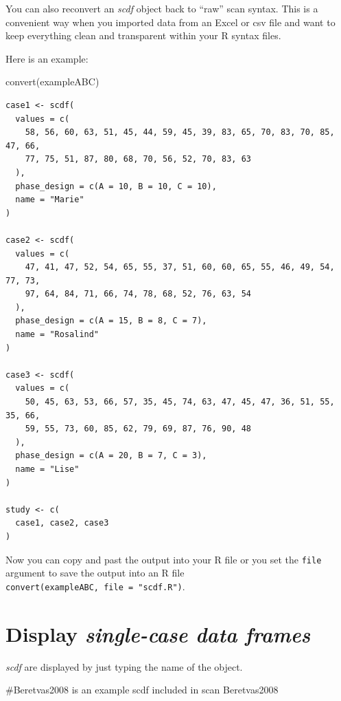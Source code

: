 \documentclass[
  letterpaper,
  DIV=11,
  numbers=noendperiod]{scrreprt}
\newenvironment{Shaded}{\begin{snugshade}}{\end{snugshade}}
\newcommand{\CommentTok}[1]{\textcolor[rgb]{0.37,0.37,0.37}{#1}}
\newcommand{\FunctionTok}[1]{\textcolor[rgb]{0.28,0.35,0.67}{#1}}
\newcommand{\NormalTok}[1]{\textcolor[rgb]{0.00,0.23,0.31}{#1}}
\begin{document}
You can also reconvert an \emph{scdf} object back to ``raw'' scan
syntax. This is a convenient way when you imported data from an Excel or
csv file and want to keep everything clean and transparent within your R
syntax files.

Here is an example:

\begin{Shaded}
\begin{Highlighting}[]
\FunctionTok{convert}\NormalTok{(exampleABC)}
\end{Highlighting}
\end{Shaded}

\begin{verbatim}
case1 <- scdf(
  values = c(
    58, 56, 60, 63, 51, 45, 44, 59, 45, 39, 83, 65, 70, 83, 70, 85, 47, 66,
    77, 75, 51, 87, 80, 68, 70, 56, 52, 70, 83, 63
  ),
  phase_design = c(A = 10, B = 10, C = 10),
  name = "Marie"
)

case2 <- scdf(
  values = c(
    47, 41, 47, 52, 54, 65, 55, 37, 51, 60, 60, 65, 55, 46, 49, 54, 77, 73,
    97, 64, 84, 71, 66, 74, 78, 68, 52, 76, 63, 54
  ),
  phase_design = c(A = 15, B = 8, C = 7),
  name = "Rosalind"
)

case3 <- scdf(
  values = c(
    50, 45, 63, 53, 66, 57, 35, 45, 74, 63, 47, 45, 47, 36, 51, 55, 35, 66,
    59, 55, 73, 60, 85, 62, 79, 69, 87, 76, 90, 48
  ),
  phase_design = c(A = 20, B = 7, C = 3),
  name = "Lise"
)

study <- c(
  case1, case2, case3
)
\end{verbatim}

Now you can copy and past the output into your R file or you set the
\texttt{file} argument to save the output into an R file
\texttt{convert(exampleABC,\ file\ =\ "scdf.R")}.

\hypertarget{display-single-case-data-frames}{%
\section{\texorpdfstring{Display \emph{single-case data
frames}}{Display single-case data frames}}\label{display-single-case-data-frames}}

\emph{scdf} are displayed by just typing the name of the object.

\begin{Shaded}
\begin{Highlighting}[]
\CommentTok{\#Beretvas2008 is an example scdf included in scan}
\NormalTok{Beretvas2008}
\end{Highlighting}
\end{Shaded}
\end{document}
